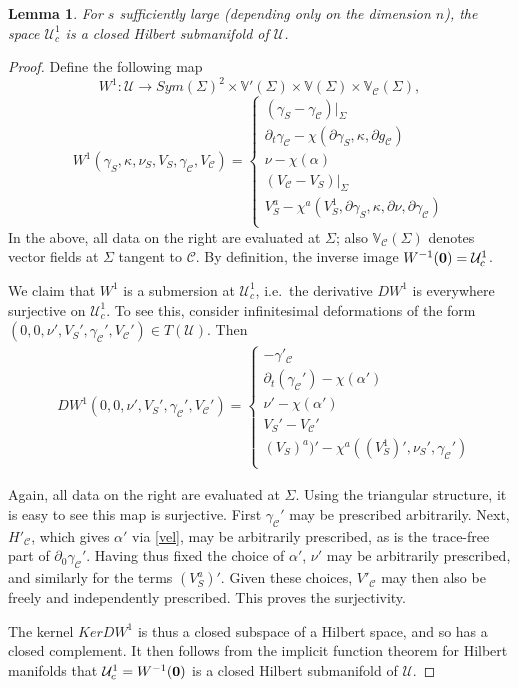 \documentclass[10pt,a4paper]{amsart}
\newtheorem{lemma}{Lemma}
\newcommand{\Si}{\Sigma}
\renewcommand{\a}{\alpha}
\newcommand{\bV}{\mathbb V}
\newcommand{\be}{\begin{equation}}
\newcommand{\bes}{\begin{equation*}}
\newcommand{\cC}{{\mathcal C}}
\newcommand{\cU}{{\mathcal U}}
\newcommand{\ee}{\end{equation}}
\newcommand{\ees}{\end{equation*}}
\newcommand{\g}{\gamma}
\renewcommand{\k}{\kappa}
\newcommand{\p}{\partial}
\renewcommand{\to}{\rightarrow}
\begin{document}
\begin{lemma}\label{Man1}
For $s$ sufficiently large (depending only on the dimension $n$), the space $\cU_c^1$ is a closed Hilbert submanifold of $\cU$. 
\end{lemma}

\begin{proof}
    Define the following map 
\be \label{CompOp1}
W^1: \cU \to Sym(\Si)^2 \times \bV'(\Si) \times \bV(\Si) \times \bV_{\cC}(\Si),
\ee
\bes
W^1(\g_S, \k, \nu_S, V_S, \g_{\cC}, V_{\cC}) = 
\left\{ 
\begin{array}{l}
(\g_S - \g_{\cC})|_{\Si} \\
\p_t \g_{\cC} - \chi(\p \g_S, \k, \p g_\cC) \\
\nu - \chi(\a) \\
(V_{\cC} - V_S)|_{\Si} \\
V_S^a - \chi^a(V_S^1,\p \g_S,\k,\p \nu,\p \g_\cC) \\
\end{array}\right.
\ees
In the above, all data on the right are evaluated at $\Si$; also $\bV_{\cC}(\Si)$ denotes vector fields at $\Si$ tangent to $\cC$. 
By definition, the inverse image $W^{-1}({\bf 0}) = \cU_c^1$. 

  We claim that $W^1$ is a submersion at $\cU_c^1$, i.e.~the derivative $DW^1$ is everywhere surjective on $\cU_c^1$. To see this, consider 
infinitesimal deformations of the form $(0, 0, \nu', V_S', \g_{\cC}', V_{\cC}' ) \in T(\cU)$. Then 
\bes 
\begin{split}
& DW^1(0, 0, \nu', V_S', \g_{\cC}', V_{\cC}' ) = 
\begin{cases}
- \g'_{\cC} \\
 \p_t (\g_{\cC}') - \chi(\a')\\
 \nu' - \chi(\a')\\
 V_S' - V_{\cC}'\\
 (V_S)^a)' - \chi^a((V_S^1)', \nu_S', \g_{\cC}') \\
 \end{cases}
\end{split}
\ees

  Again, all data on the right are evaluated at $\Si$. Using the triangular structure, it is easy to see this map is surjective. First $\g_{\cC}'$ may be prescribed 
arbitrarily. Next, $H'_{\cC}$, which gives $\a'$ via \eqref{vel}, may be arbitrarily prescribed, as is the trace-free part of $\p_0 \g_{\cC}'$. Having thus fixed the 
choice of $\a'$, $\nu'$ may be arbitrarily prescribed, and similarly for the terms $(V_S^a)'$. Given these choices, $V'_{\cC}$ 
may then also be freely and independently prescribed. This proves the surjectivity. 


The kernel $Ker DW^1$ is thus a closed subspace of a Hilbert space, and so has a closed complement. It then follows from the implicit function theorem for 
Hilbert manifolds that $\cU_c^1 = W^{-1}({\bf 0})$ is a closed Hilbert submanifold of $\cU$. 

\end{proof}
\end{document}
